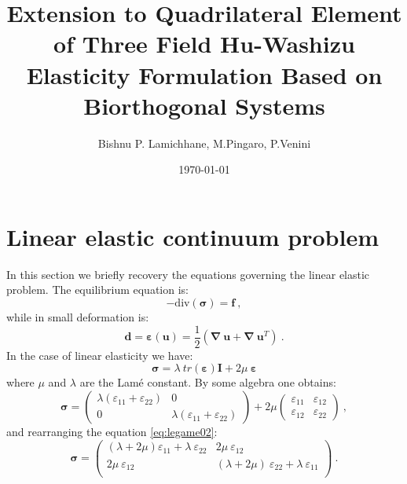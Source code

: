 \documentclass[a4paper,11pt]{article}
\title{\textbf{Extension to Quadrilateral Element of Three Field Hu-Washizu Elasticity Formulation Based on Biorthogonal Systems}}
\date{\today}
\author{Bishnu P. Lamichhane, M.Pingaro, P.Venini}
\begin{document}
\maketitle

\section{Linear elastic continuum problem}
In this section we briefly recovery the equations governing the linear elastic problem. 
The equilibrium equation is:
\begin{equation} \label{eq:equilibrio01}
- \mbox{div}(\bm{\sigma}) = \bm{f}\:,
\end{equation}
while in small deformation is:
\begin{equation}\label{eq:congruenza01}
\bm{d} = \bm{\varepsilon}(\bm{u}) = 
\frac{1}{2}(\bm{\nabla} \: \bm{u} + \bm{\nabla} \: \bm{u}^{T}) \:.
\end{equation}
In the case of linear elasticity we have:
\begin{equation} \label{eq:legame01}
\bm{\sigma} = \lambda \: tr(\bm{\varepsilon}) \bm{I} 
+ 2\mu \: \bm{\varepsilon}
\end{equation}
where $\mu$ and $\lambda$ are the Lamé constant.
By some algebra one obtains:
\begin{equation} \label{eq:legame02}
\bm{\sigma} =
\left(
\begin{array}{cc}
\lambda (\varepsilon_{11} + \varepsilon_{22}) & 0 \\
0 & \lambda (\varepsilon_{11} + \varepsilon_{22}) 
\end{array}
\right) +2\mu
\left(
\begin{array}{cc}
\varepsilon_{11} & \varepsilon_{12} \\
\varepsilon_{12} & \varepsilon_{22}
\end{array}
\right)\:,
\end{equation}
and rearranging the equation \eqref{eq:legame02}:
\begin{equation} \label{eq:legame03}
\bm{\sigma} =
\left(
\begin{array}{ll}
(\lambda+2\mu) \varepsilon_{11} + \lambda \: \varepsilon_{22} & 2\mu \: \varepsilon_{12} \\
2\mu \: \varepsilon_{12} & (\lambda+2\mu) \: \varepsilon_{22} + \lambda \: \varepsilon_{11}  \\
\end{array}
\right)\:.
\end{equation}
\end{document}
